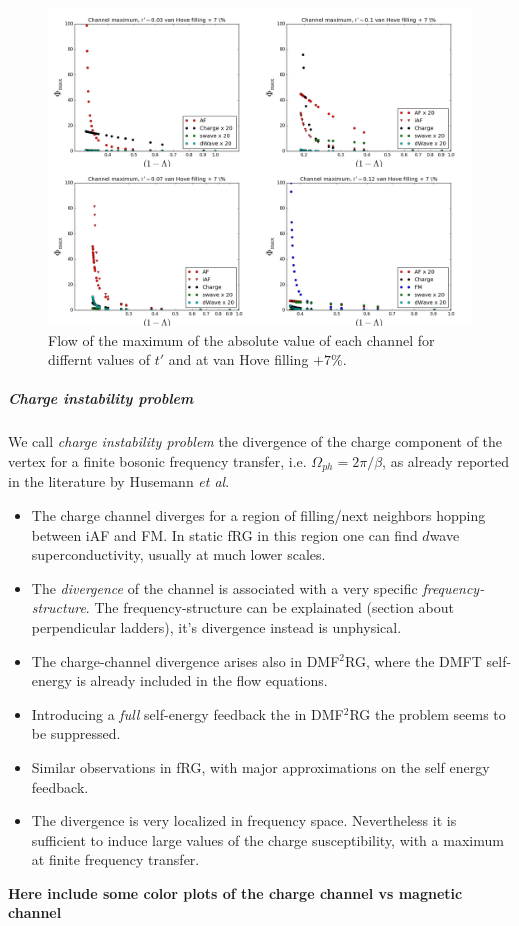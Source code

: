 \begin{figure}
\includegraphics[scale=0.25]{images/vanhovepluslambda.png}
\caption{Flow of the maximum of the absolute value of each channel for differnt values of $t'$ and at van Hove filling $+7 \%$.
} 
\label{lamvanplus} 
\end{figure}

\subparagraph{Charge instability problem}

We call \textit{charge instability problem} the divergence of the charge component of the vertex for a finite bosonic frequency transfer, i.e. $\Omega_{ph} = 2\pi/\beta$, as already reported in the literature by Husemann \emph{et al}. 
\begin{itemize}
\item The charge channel diverges for a region of filling/next neighbors hopping between iAF and FM. In static fRG in this region one can find $d$wave superconductivity, usually at much lower scales. 
\item The \textit{divergence} of the channel is associated with a very specific \textit{frequency-structure}. The frequency-structure can be explainated (section about perpendicular ladders), it's divergence instead is unphysical. 
\item The charge-channel divergence arises also in DMF$^2$RG, where the DMFT self-energy is already included in the flow equations. 
\item Introducing a \emph{full} self-energy feedback the in DMF$^2$RG the problem seems to be suppressed. 
\item Similar observations in fRG, with major approximations on the self energy feedback.
\item The divergence is very localized in frequency space. Nevertheless it is sufficient to induce large values of the charge susceptibility, with a maximum at finite frequency transfer.    
\end{itemize} 
 
\textbf{Here include some color plots of the charge channel vs magnetic channel}

